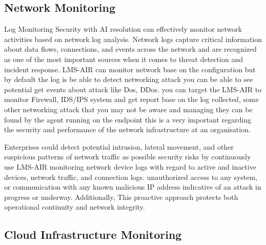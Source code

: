\subsection{Network Monitoring}

Log Monitoring Security with AI resolution can effectively monitor network activities based on network log analysis. Network logs capture critical information about data flows, connections, and events across the network and are recognized as one of the most important sources when it comes to threat detection and incident response. LMS-AIR can monitor network base on the configuration but by default the log is be able to detect networking attack you can be able to see potential get events about attack like Dos, DDos. you can target the LMS-AIR to monitor Firewall, IDS/IPS system and get report base on the log collected,  some other networking attack that you may not be aware and managing they can be found by the agent running on the endpoint this is a very important  regarding the security and performance of the network infrastructure at an organisation. 

Enterprises could detect potential intrusion, lateral movement, and other suspicious patterns of network traffic as possible security risks by continuously use LMS-AIR monitoring network device logs with regard to active and inactive devices, network traffic, and connection logs.  unauthorized access to any system, or communication with any known malicious IP address indicative of an attack in progress or underway. Additionally, This proactive approach protects both operational continuity and network integrity\cite{vaarandi2013comparative}.



\subsection{Cloud Infrastructure Monitoring}

